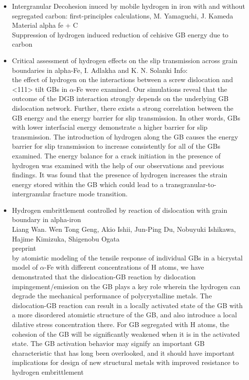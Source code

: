 \documentclass[11pt,floatfix,showpacs]{amsart}
\begin{document}
\begin{itemize}
\item Intergranular Decohesion inuced by mobile hydrogen in iron with and without segregated carbon: first-principles calculations, M. Yamaguchi, J. Kameda\\
Material alpha fe + C \\
Suppression of hydrogen induced reduction of cehisive GB energy due to carbon 
\item Critical assessment of
hydrogen effects on the slip
transmission across grain
boundaries in alpha-Fe, I. Adlakha and K. N. Solanki
Info:\\
the effect of hydrogen on the interactions between a screw dislocation and <111> tilt GBs in $\alpha$-Fe were examined. Our simulations reveal that the outcome of the DGB interaction strongly depends on the underlying GB dislocation network. Further, there exists a strong correlation between the GB energy and the energy barrier for slip transmission. In other words, GBs with lower interfacial energy demonstrate a higher barrier for slip transmission. The introduction of hydrogen along the GB causes the energy barrier for slip transmission to increase consistently for all of the GBs examined. The energy balance for a crack initiation in the presence of hydrogen was examined with the help of our observations and previous findings. It was found that the presence of hydrogen increases the strain energy stored within the GB which could lead to a transgranular-to-intergranular fracture mode transition.

\item Hydrogen embrittlement controlled by reaction of dislocation with grain boundary in alpha-iron\\
Liang Wan. Wen Tong Geng, Akio Ishii, Jun-Ping Du, Nobuyuki Ishikawa, Hajime Kimizuka, Shigenobu Ogata\\
preprint\\
by atomistic modeling of the tensile response of individual GBs in a bicrystal model of $\alpha$-Fe with different concentrations of H atoms, we have demonstrated that the dislocation-GB reaction by dislocation impingement/emission on the GB plays a key role wherein the hydrogen can degrade the mechanical performance of polycrystalline metals. The dislocation-GB reaction can result in a locally activated state of the GB with a more disordered atomistic structure of the GB, and also introduce a local dilative stress concentration there. For GB segregated with H atoms, the cohesion of the GB will be significantly weakened when it is in the activated state. The GB activation behavior may signify an important GB characteristic that has long been overlooked, and it should have important implications for design of new structural metals with improved resistance to hydrogen embrittlement


\end{itemize}
\end{document}
